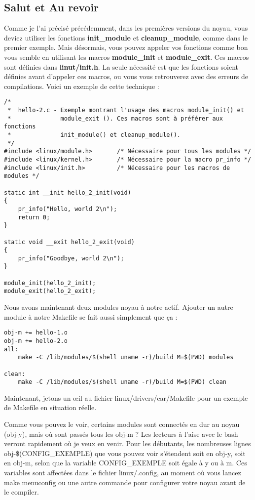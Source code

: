 \documentclass[11pt]{article}
\begin{document}
\subsection*{Salut et Au revoir}
\label{sec-4-2}

Comme je l'ai précisé précédemment, dans les premières versions du noyau, vous deviez utiliser les fonctions \textbf{init\_module} et \textbf{cleanup\_module}, comme dans le premier exemple. Mais désormais, vous pouvez appeler vos fonctions comme bon vous semble en utilisant les macros \textbf{module\_init} et \textbf{module\_exit}. Ces macros sont définies dans \textbf{linut/init.h}. La seule nécessité est que les fonctions soient définies avant d'appeler ces macros, ou vous vous retrouverez avec des erreurs de compilations. Voici un exemple de cette technique :

\begin{verbatim}
/*
 *  hello-2.c - Exemple montrant l'usage des macros module_init() et
 *              module_exit (). Ces macros sont à préférer aux fonctions
 *              init_module() et cleanup_module().
 */
#include <linux/module.h>       /* Nécessaire pour tous les modules */
#include <linux/kernel.h>       /* Nécessaire pour la macro pr_info */
#include <linux/init.h>         /* Nécessaire pour les macros de modules */

static int __init hello_2_init(void)
{
    pr_info("Hello, world 2\n");
    return 0;
}

static void __exit hello_2_exit(void)
{
    pr_info("Goodbye, world 2\n");
}

module_init(hello_2_init);
module_exit(hello_2_exit);
\end{verbatim}

Nous avons maintenant deux modules noyau à notre actif. Ajouter un autre module à notre Makefile se fait aussi simplement que ça :

\begin{verbatim}
obj-m += hello-1.o
obj-m += hello-2.o
all:
    make -C /lib/modules/$(shell uname -r)/build M=$(PWD) modules

clean:
    make -C /lib/modules/$(shell uname -r)/build M=$(PWD) clean
\end{verbatim}

Maintenant, jetons un œil au fichier linux/drivers/car/Makefile pour un exemple de Makefile en situation réelle.

Comme vous pouvez le voir, certains modules sont connectés en dur au noyau (obj-y), mais où sont passés tous les obj-m ? Les lecteurs à l'aise avec le bash verront rapidement où je veux en venir. Pour les débutants, les nombreuses lignes obj-\$(CONFIG\_EXEMPLE) que vous pouvez voir s'étendent soit en obj-y, soit en obj-m, selon que la variable CONFIG\_EXEMPLE soit égale à y ou à m. Ces variables sont affectées dans le fichier linux/.config, au moment où vous lancez make menuconfig ou une autre commande pour configurer votre noyau avant de le compiler.
\end{document}
